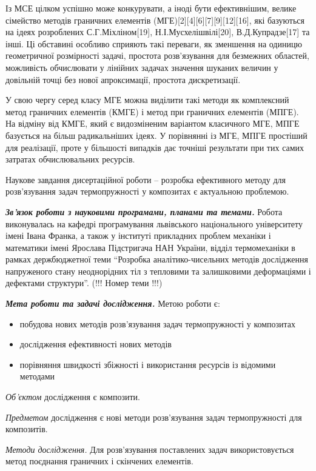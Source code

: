 Із МСЕ цілком успішно може конкурувати, а іноді бути ефективнішим,
велике сімейство методів граничних елементів
(МГЕ){[}2{]}{[}4{]}{[}6{]}{[}7{]}{[}9{]}{[}12{]}{[}16{]}, які базуються
на ідеях розроблених С.Г.Міхліном{[}19{]}, Н.І.Мусхелішвілі{[}20{]},
В.Д.Купрадзе{[}17{]} та інші. Ці обставині особливо сприяють такі
переваги, як зменшення на одиницю геометричної розмірності задачі,
простота розв'язування для безмежних областей, можливість обчислювати у
лінійних задачах значення шуканих величин у довільній точці без нової
апроксимації, простота дискретизації.

У свою чергу серед класу МГЕ можна виділити такі методи як комплексний
метод граничних елементів (КМГЕ) і метод при граничних елементів (МПГЕ).
На відміну від КМГЕ, який є видозміненим варіантом класичного МГЕ, МПГЕ
базується на більш радикальніших ідеях. У порівнянні із МГЕ, МПГЕ
простіший для реалізації, проте у більшості випадків дає точніші
результати при тих самих затратах обчислювальних ресурсів.

Наукове завдання дисертаційної роботи -- розробка ефективного методу для
розв'язування задач термопружності у композитах є актуальною проблемою.

\emph{\textbf{Зв'язок роботи з науковими програмами, планами та
темами.}} Робота виконувалась на кафедрі програмування львівського
національного університету імені Івана Франка, а також у інституті
прикладних проблем механіки і математики імені Ярослава Підстригача НАН
України, відділ термомеханіки в рамках держбюджетної теми ``Розробка
аналітико-чисельних методів дослідження напруженого стану неоднорідних
тіл з тепловими та залишковими деформаціями і дефектами структури''.
(!!! Номер теми !!!)

\emph{\textbf{Мета роботи та задачі дослідження.}} Метою роботи є:

\begin{itemize}
\item
  побудова нових методів розв'язування задач термопружності у композитах
\item
  дослідження ефективності нових методів
\item
  порівняння швидкості збіжності і використання ресурсів із відомими
  методами
\end{itemize}

\emph{Об'єктом} дослідження є композити.

\emph{Предметом} дослідження є нові методи розв'язування задач
термопружності для композитів.

\emph{Методи дослідження.} Для розв'язування поставлених задач
використовується метод поєднання граничних і скінчених елементів.

